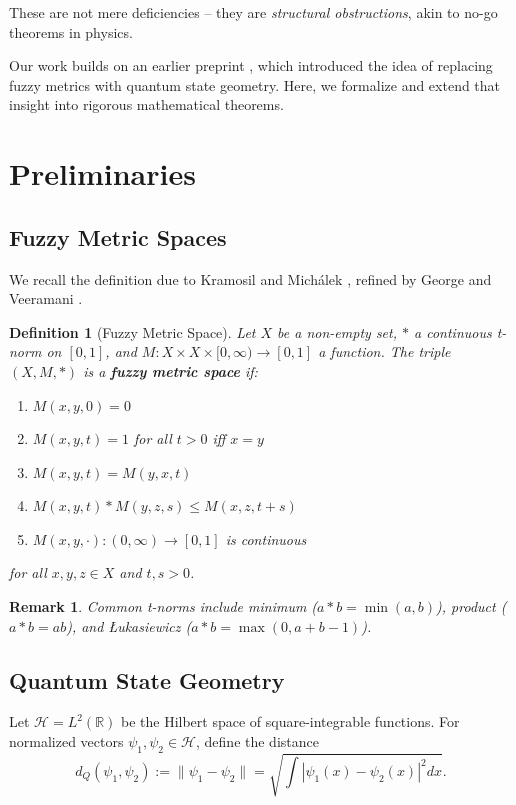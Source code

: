 \documentclass{article}
\newtheorem{definition}[theorem]{Definition}
\newtheorem{remark}[theorem]{Remark}
\begin{document}
These are not mere deficiencies -- they are \emph{structural obstructions}, akin to no-go theorems in physics.

Our work builds on an earlier preprint \cite{preprint1}, which introduced the idea of replacing fuzzy metrics with quantum state geometry. Here, we formalize and extend that insight into rigorous mathematical theorems.


\section{Preliminaries}

\subsection{Fuzzy Metric Spaces}

We recall the definition due to Kramosil and Mich\'alek \cite{kramosil1975fuzzy}, refined by George and Veeramani \cite{george1994some}.

\begin{definition}[Fuzzy Metric Space]
Let $X$ be a non-empty set, $*$ a continuous t-norm on $[0,1]$, and $M: X \times X \times [0,\infty) \to [0,1]$ a function. The triple $(X,M,*)$ is a \textbf{fuzzy metric space} if:
\begin{enumerate}
    \item $M(x,y,0) = 0$
    \item $M(x,y,t) = 1$ for all $t > 0$ iff $x = y$
    \item $M(x,y,t) = M(y,x,t)$
    \item $M(x,y,t) * M(y,z,s) \leq M(x,z,t+s)$
    \item $M(x,y,\cdot): (0,\infty) \to [0,1]$ is continuous
\end{enumerate}
for all $x,y,z \in X$ and $t,s > 0$.
\end{definition}

\begin{remark}
Common t-norms include minimum ($a*b = \min(a,b)$), product ($a*b = ab$), and Łukasiewicz ($a*b = \max(0,a+b-1)$).
\end{remark}

\subsection{Quantum State Geometry}

Let $\mathcal{H} = L^2(\mathbb{R})$ be the Hilbert space of square-integrable functions. For normalized vectors $\psi_1,\psi_2 \in \mathcal{H}$, define the distance
$$
d_Q(\psi_1,\psi_2) := \|\psi_1 - \psi_2\| = \sqrt{\int |\psi_1(x) - \psi_2(x)|^2 dx}.
$$
\end{document}
